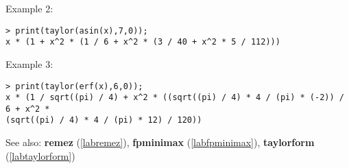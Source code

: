 \noindent Example 2: 
\begin{center}\begin{minipage}{15cm}\begin{Verbatim}[frame=single]
> print(taylor(asin(x),7,0));
x * (1 + x^2 * (1 / 6 + x^2 * (3 / 40 + x^2 * 5 / 112)))
\end{Verbatim}
\end{minipage}\end{center}
\noindent Example 3: 
\begin{center}\begin{minipage}{15cm}\begin{Verbatim}[frame=single]
> print(taylor(erf(x),6,0));
x * (1 / sqrt((pi) / 4) + x^2 * ((sqrt((pi) / 4) * 4 / (pi) * (-2)) / 6 + x^2 * 
(sqrt((pi) / 4) * 4 / (pi) * 12) / 120))
\end{Verbatim}
\end{minipage}\end{center}
See also: \textbf{remez} (\ref{labremez}), \textbf{fpminimax} (\ref{labfpminimax}), \textbf{taylorform} (\ref{labtaylorform})
